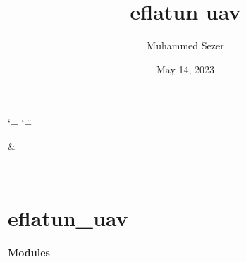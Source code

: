 \documentclass[letterpaper,10pt,english]{sphinxmanual}
\title{eflatun uav}
\date{May 14, 2023}
\author{Muhammed Sezer}
\begin{document}
\ifdefined\shorthandoff
  \ifnum\catcode`\=\string=\active\shorthandoff{=}\fi
  \ifnum\catcode`\"=\active{}\fi
\fi

\pagestyle{empty}
\sphinxmaketitle
\pagestyle{plain}
\sphinxtableofcontents
\pagestyle{normal}
\label{\detokenize{index::doc}}


\sphinxstepscope


\begin{savenotes}\sphinxattablestart
\sphinxthistablewithglobalstyle
\sphinxthistablewithnovlinesstyle
\centering
\begin{tabulary}{\linewidth}[t]{}
\sphinxtoprule
\sphinxtableatstartofbodyhook
\sphinxAtStartPar
{\hyperref[\detokenize{generated/eflatun_uav:module-eflatun_uav}]{}}
&
\sphinxAtStartPar

\\
\sphinxbottomrule
\end{tabulary}
\sphinxtableafterendhook\par
\sphinxattableend\end{savenotes}

\sphinxstepscope


\chapter{eflatun\_uav}
\label{\detokenize{generated/eflatun_uav:module-eflatun_uav}}\label{\detokenize{generated/eflatun_uav:eflatun-uav}}\label{\detokenize{generated/eflatun_uav::doc}}\label{\detokenize{generated/eflatun_uav::doc}}\subsubsection*{Modules}
\end{document}

